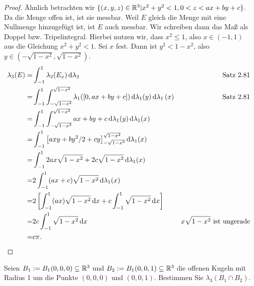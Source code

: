 \begin{proof}
	Ähnlich betrachten wir $\{(x,y,z)\in\mathbb{R}^3|x^2+y^2<1,0 <z<ax+by+c\} $. Da die Menge offen ist, ist sie messbar. Weil $E$ gleich die Menge mit eine Nullmenge hinzugefügt ist, ist $E$ auch messbar. Wir schreiben dann das Maß als Doppel bzw. Tripelintegral. Hierbei nutzen wir, dass $x^2\le 1$, also $x\in (-1,1)$ aus die Gleichung $x^2+y^2<1$. Sei $x$ fest. Dann ist $y^2 < 1-x^2$, also $y\in (-\sqrt{1-x^2},\sqrt{1-x^2})$.
	\begin{align*}
		\lambda_3(E)=&\int_{-1}^1 \lambda_2(E_x)\dd{\lambda_2} &\text{Satz 2.81}\\
		=&\int_{-1}^1\int_{-\sqrt{1-x^2} }^{\sqrt{1-x^2} }\lambda_1([0,ax+by+c])\dd{\lambda_1(y)}\dd{\lambda_1\left(x \right) } & \text{Satz 2.81}\\
		=&\int_{-1}^1\int_{-\sqrt{1-x^2}}^{\sqrt{1-x^2} }ax+by+c\dd{\lambda_1(y)}\dd{\lambda_1(x)}\\
		=&\int_{-1}^1 \left[ axy+by^2 / 2 + cy \right]_{-\sqrt{1-x^2} }^{\sqrt{1-x^2} }\dd{\lambda_1(x)}\\
		=&\int_{-1}^1 2ax\sqrt{1-x^2} +2c\sqrt{1-x^2} \dd{\lambda_1(x)}\\
		=&2\int_{-1}^1 (ax+c)\sqrt{1-x^2} \dd{\lambda_1(x)}\\
		=&2\left[ \int_{-1}^1 (ax)\sqrt{1-x^2} \dd{x}+c\int_{-1}^1 \sqrt{1-x^2} \dd{x} \right] \\
		=&2c\int_{-1}^1 \sqrt{1-x^2} \dd{x} & x\sqrt{1-x^2}\text{ ist ungerade}\\
		=&c\pi. & \qedhere
	\end{align*}
\end{proof}
\begin{Problem}
	Seien $B_1:=B_1(0,0,0)\subseteq \mathbb{R}^3$ und $B_2:=B_1(0,0,1)\subseteq \mathbb{R}^3$ die offenen Kugeln mit Radius 1 um die Punkte $(0,0,0)$ und $(0,0,1)$. Bestimmen Sie $\lambda_3(B_1\cap B_2)$.
\end{Problem}
